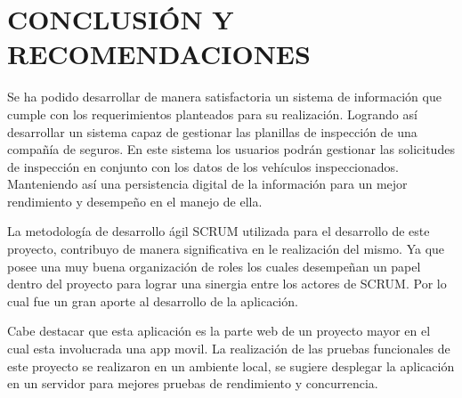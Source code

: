 \chapter*{CONCLUSIÓN Y RECOMENDACIONES }



\setlength{\parskip}{5mm}

Se ha podido desarrollar de manera satisfactoria un sistema de información que cumple con los requerimientos planteados para su realización. Logrando así desarrollar un sistema capaz de gestionar las planillas de inspección de una compañía de seguros. En este sistema los usuarios podrán gestionar las solicitudes de inspección en conjunto con los datos de los vehículos inspeccionados. Manteniendo así una persistencia digital de la información para un mejor rendimiento y desempeño en el manejo de ella.

La metodología de desarrollo ágil SCRUM utilizada para el desarrollo de este proyecto, contribuyo de manera significativa en le realización del mismo. Ya que posee una muy buena organización de roles los cuales desempeñan un papel dentro del proyecto para lograr una sinergia entre los actores de SCRUM. Por lo cual fue un gran aporte al desarrollo de la aplicación.


Cabe destacar que esta aplicación es la parte web de un proyecto mayor en el cual esta involucrada una app movil. La realización de las pruebas funcionales de este proyecto se realizaron en un ambiente local, se sugiere desplegar la aplicación en un servidor para mejores pruebas de rendimiento y concurrencia.







\setlength{\parskip}{0mm}